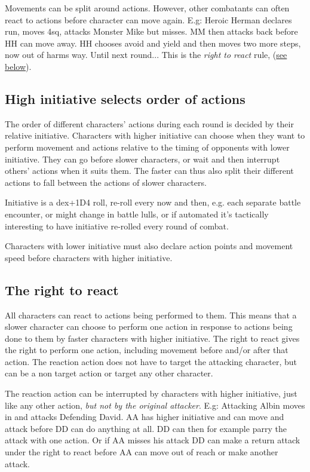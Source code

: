 Movements can be split around actions. However, other combatants can often react to actions before character can move again. E.g: Heroic Herman declares run, moves 4sq, attacks Monster Mike but misses. MM then attacks back before HH can move away. HH chooses avoid and yield and then moves two more steps, now out of harms way. Until next round... This is the \emph{right to react} rule, (\hyperref[righttoreact]{see below}).


\subsection*{High initiative selects order of actions}
The order of different characters' actions during each round is decided by their relative initiative. Characters with higher initiative can choose when they want to perform movement and actions relative to the timing of opponents with lower initiative. They can go before slower characters, or wait and then interrupt others' actions when it suits them. The faster can thus also split their different actions to fall between the actions of slower characters.

Initiative is a dex+1D4 roll, re-roll every now and then, e.g. each separate battle encounter, or might change in battle lulls, or if automated it's tactically interesting to have initiative re-rolled every round of combat.

Characters with lower initiative must also declare action points and movement speed before characters with higher initiative.


\subsection*{The right to react}
\label{righttoreact}
All characters can react to actions being performed to them. This means that a slower character can choose to perform one action in response to actions being done to them by faster characters with higher initiative.
The right to react gives the right to perform one action, including movement before and/or after that action. The reaction action does not have to target the attacking character, but can be a non target action or target any other character.

The reaction action can be interrupted by characters with higher initiative, just like any other action, \emph{but not by the original attacker}. 
E.g: Attacking Albin moves in and attacks Defending David. AA has higher initiative and can move and attack before DD can do anything at all. DD can then for example parry the attack with one action. Or if AA misses his attack DD can make a return attack under the right to react before AA can move out of reach or make another attack.


